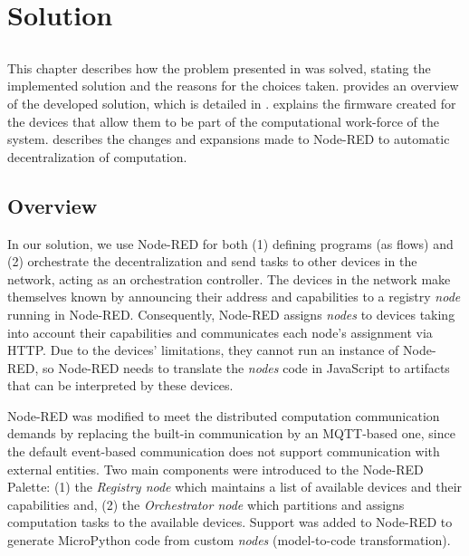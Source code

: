 \chapter{Solution} \label{chap:solution}

\section*{}

\setcounter{minitocdepth}{3}
\minitoc \mtcskip \noindent
This chapter describes how the problem presented in  was solved, stating the implemented solution and the reasons for the choices taken.  provides an overview of the developed solution, which is detailed in .  explains the firmware created for the devices that allow them to be part of the computational work-force of the system.  describes the changes and expansions made to Node-RED to automatic decentralization of computation.

\setcounter{minitocdepth}{1}

\section{Overview}\label{sec:solution_overview}

In our solution, we use Node-RED for both (1) defining programs (as flows) and (2) orchestrate the decentralization and send tasks to other devices in the network, acting as an orchestration controller. The devices in the network make themselves known by announcing their address and capabilities to a registry \textit{node} running in Node-RED. Consequently, Node-RED assigns \textit{nodes} to devices taking into account their capabilities and communicates each node's assignment via HTTP. Due to the devices' limitations, they cannot run an instance of Node-RED, so Node-RED needs to translate the \textit{nodes} code in JavaScript to artifacts that can be interpreted by these devices. 

Node-RED was modified to meet the distributed computation communication demands by replacing the built-in communication by an MQTT-based one, since the default event-based communication does not support communication with external entities. Two main components were introduced to the Node-RED Palette: (1) the \textit{Registry node} which maintains a list of available devices and their capabilities and, (2) the \textit{Orchestrator node} which partitions and assigns computation tasks to the available devices. Support was added to Node-RED to generate MicroPython code from custom \textit{nodes} (\ie model-to-code transformation).

